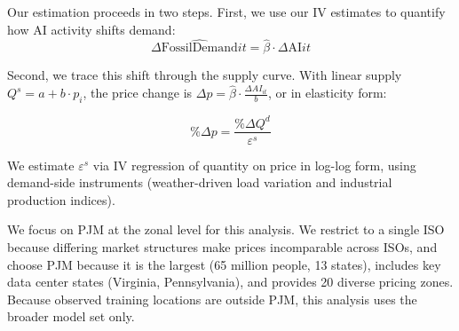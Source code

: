 \documentclass[sigconf]{acmart}
\begin{document}
Our estimation proceeds in two steps. First, we use our IV estimates to quantify how AI activity shifts demand:
\begin{equation}
\Delta \widehat{\text{FossilDemand}}{it} = \hat{\beta} \cdot \Delta \text{AI}{it}
\label{eq:demand-change}
\end{equation}

Second, we trace this shift through the supply curve. With linear supply $Q^s=a+b\cdot p_i$, the price change is $\Delta p=\hat{\beta}\cdot \frac{\Delta AI_{it}}{b}$, or in elasticity form:

\begin{equation}
\% \Delta p = \frac{\% \Delta Q^d}{\varepsilon^s}
\label{eq
:price-impact-elasticity}
\end{equation}

We estimate $\varepsilon^s$ via IV regression of quantity on price in log-log form, using demand-side instruments (weather-driven load variation and industrial production indices).

We focus on PJM at the zonal level for this analysis. We restrict to a single ISO because differing market structures make prices incomparable across ISOs, and choose PJM because it is the largest (65 million people, 13 states), includes key data center states (Virginia, Pennsylvania), and provides 20 diverse pricing zones. Because observed training locations are outside PJM, this analysis uses the broader model set only.
\end{document}
